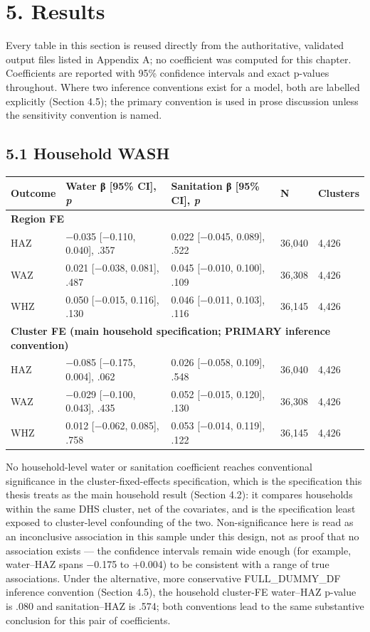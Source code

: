 \section*{5. Results}

Every table in this section is reused directly from the authoritative, validated output files listed in Appendix A; no coefficient was computed for this chapter. Coefficients are reported with 95\% confidence intervals and exact p-values throughout. Where two inference conventions exist for a model, both are labelled explicitly (Section 4.5); the primary convention is used in prose discussion unless the sensitivity convention is named.

\subsection*{5.1 Household WASH}

\begingroup\fontsize{10}{15}\selectfont
\begin{longtable}{lllll}
\toprule
Outcome & Water β [95\% CI], \textit{p} & Sanitation β [95\% CI], \textit{p} & N & Clusters \\
\midrule
\endhead
\multicolumn{5}{l}{\textbf{Region FE}} \\
HAZ & −0.035 [−0.110, 0.040], .357 & 0.022 [−0.045, 0.089], .522 & 36,040 & 4,426 \\
WAZ & 0.021 [−0.038, 0.081], .487 & 0.045 [−0.010, 0.100], .109 & 36,308 & 4,426 \\
WHZ & 0.050 [−0.015, 0.116], .130 & 0.046 [−0.011, 0.103], .116 & 36,145 & 4,426 \\
\multicolumn{5}{l}{\textbf{Cluster FE (main household specification; PRIMARY inference convention)}} \\
HAZ & −0.085 [−0.175, 0.004], .062 & 0.026 [−0.058, 0.109], .548 & 36,040 & 4,426 \\
WAZ & −0.029 [−0.100, 0.043], .435 & 0.052 [−0.015, 0.120], .130 & 36,308 & 4,426 \\
WHZ & 0.012 [−0.062, 0.085], .758 & 0.053 [−0.014, 0.119], .122 & 36,145 & 4,426 \\
\bottomrule
\end{longtable}
\endgroup

No household-level water or sanitation coefficient reaches conventional significance in the cluster-fixed-effects specification, which is the specification this thesis treats as the main household result (Section 4.2): it compares households within the same DHS cluster, net of the covariates, and is the specification least exposed to cluster-level confounding of the two. Non-significance here is read as an inconclusive association in this sample under this design, not as proof that no association exists --- the confidence intervals remain wide enough (for example, water--HAZ spans −0.175 to +0.004) to be consistent with a range of true associations. Under the alternative, more conservative FULL\_DUMMY\_DF inference convention (Section 4.5), the household cluster-FE water--HAZ p-value is .080 and sanitation--HAZ is .574; both conventions lead to the same substantive conclusion for this pair of coefficients.

